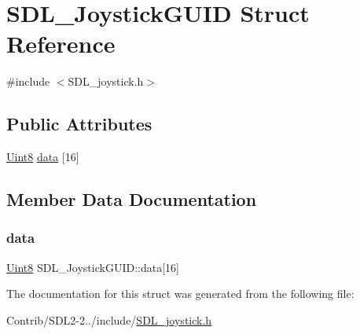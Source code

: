 \hypertarget{struct_s_d_l___joystick_g_u_i_d}{}\section{S\+D\+L\+\_\+\+Joystick\+G\+U\+ID Struct Reference}
\label{struct_s_d_l___joystick_g_u_i_d}


{\ttfamily \#include $<$S\+D\+L\+\_\+joystick.\+h$>$}

\subsection*{Public Attributes}
\begin{DoxyCompactItemize}
\item 
\mbox{\hyperlink{_s_d_l__stdinc_8h_a2944638813a090aa23e62f4da842c3e2}{Uint8}} \mbox{\hyperlink{struct_s_d_l___joystick_g_u_i_d_a16935b928a608fe98e0509f242590597}{data}} \mbox{[}16\mbox{]}
\end{DoxyCompactItemize}


\subsection{Member Data Documentation}
\mbox{\label{struct_s_d_l___joystick_g_u_i_d_a16935b928a608fe98e0509f242590597}} 
\subsubsection{\texorpdfstring{data}{data}}
{\footnotesize\ttfamily \mbox{\hyperlink{_s_d_l__stdinc_8h_a2944638813a090aa23e62f4da842c3e2}{Uint8}} S\+D\+L\+\_\+\+Joystick\+G\+U\+I\+D\+::data\mbox{[}16\mbox{]}}



The documentation for this struct was generated from the following file\+:\begin{DoxyCompactItemize}
\item 
Contrib/\+S\+D\+L2-\/2../include/\mbox{\hyperlink{_s_d_l__joystick_8h}{S\+D\+L\+\_\+joystick.\+h}}\end{DoxyCompactItemize}
